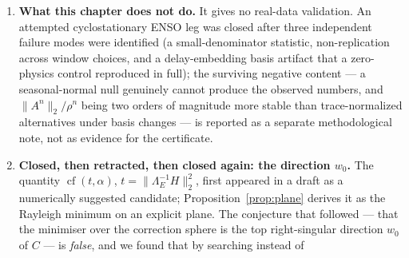 \documentclass[11pt]{article}
\theoremstyle{remark}
\newcommand{\Le}{\Lambda_E}
\begin{document}
\begin{enumerate}
width $t_{\rm hi}\le1.6\cdot10^{-3}$, so flatness in $n_t$ was construction, and the $>0.99$ /
$\le0.90$ thresholds of the previous draft measured the grid. Uniform nets are retired as a measurement
device for this question; grid-free routes (the analytic ray, the eigenvector block) replace them.
(q) the strength of the ray leg's gap fraction, and with it the reading of (iv) as a per-draw
guarantee. The ray scan \texttt{b55} falsified the claim exactly as it had been falsified-in-advance: on new tables
(doubled $p$, doubled $q$, new seed) the analytic two-jet ray's $\lambda_2$ value drops to $0.7387$
(median) in one $q=6$ cell, and along a $q$-ladder the per-cell medians fall from $1.0000$ at $q=2$ to
$0.6547$ at $q=8$ with $20/20$ draws below $0.90$ at the top of the ladder. Since the ranges I quoted in
(iv) were \emph{per-cell medians} and are now labelled as such, no number in this chapter changes sign,
but the sentence ``the grid-free route lifts $\lambda_2$ to $\ge0.9965$'' must be read as a statement
about $q\le3$ tables, and the ray leg is closed as a research direction rather than extended. What
survives on the same tables is the eigenvector block: $(\operatorname{cf}_1-\lambda_2(v_\ast))/\text{gap}$
prints $1.00$ at both its median and its maximum in all $20$ cells, i.e.\ the deficit is below
$5\cdot10^{-3}$ of the gap throughout (b53's tighter readout of the same quantity gave
$3.3\cdot10^{-7}$ to $5.0\cdot10^{-4}$).
\item \textbf{What this chapter does not do.} It gives no real-data validation. An
attempted cyclostationary ENSO leg was closed after three independent failure modes were
identified (a small-denominator statistic, non-replication across window choices, and a
delay-embedding basis artifact that a zero-physics control reproduced in full); the
surviving negative content --- a seasonal-normal null genuinely cannot produce the
observed numbers, and $\|A^n\|_2/\rho^n$ being two orders of magnitude more stable than
trace-normalized alternatives under basis changes --- is reported as a separate
methodological note, not as evidence for the certificate.
\item \textbf{Closed, then retracted, then closed again: the direction $w_0$.} The quantity
$\operatorname{cf}(t,\alpha)$, $t=\|\Le^{-1}H\|_2^2$, first appeared in a draft as a numerically
suggested candidate; Proposition~\ref{prop:plane} derives it as the Rayleigh minimum on an explicit
plane. The conjecture that followed --- that the minimiser over the correction sphere is the top
right-singular direction $w_0$ of $C$ --- is \emph{false}, and we found that by searching instead of

\end{enumerate}
\end{document}
